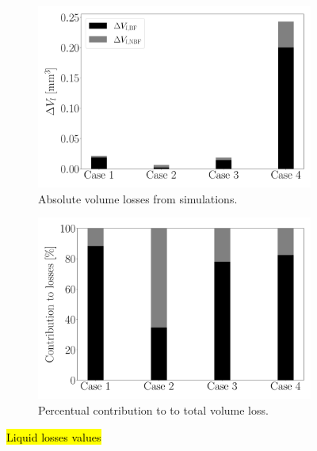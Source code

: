 \begin{figure}[ht]
\centering
\begin{subfigure}[b]{0.45\textwidth}
	\centering
   \includegraphics[scale=0.2]{./part2_developments/figures_ch5_resolved_JICF/flow_rates_mass_loss_set_levelset_band/bar_graph_dv_l}
   \caption{Absolute volume losses from simulations.}
\end{subfigure}
\hfill
\begin{subfigure}[b]{0.45\textwidth}
	\centering
   \includegraphics[scale=0.2]{./part2_developments/figures_ch5_resolved_JICF/flow_rates_mass_loss_set_levelset_band/bar_graph_losses_percentage}
   \caption{Percentual contribution to to total volume loss.}
\end{subfigure}

   \caption{\hl{Liquid losses values}}
\label{fig:JICF_liquid_losses_bar_graph}
\end{figure}


